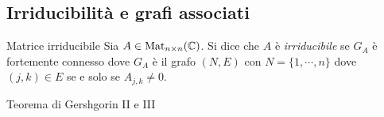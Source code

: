 \documentclass[a4paper]{article}
\begin{document}
\subsection{Irriducibilità e grafi associati}

\begin{snippetdefinition}{Matrice irriducibile}
    Sia \(A \in \operatorname{Mat}_{n \times n}(\mathbb{C})\).
    Si dice che \(A\) è \emph{irriducibile}
    se \(G_A\) è fortemente connesso dove \(G_A\)
    è il grafo \((N, E)\) con \(N = \{1, \cdots, n\}\)
    dove \((j,k) \in E\) se e solo se \(A_{j,k} \neq 0\).
\end{snippetdefinition}

\begin{radioactive}
    \begin{snippetexample}{Teorema di Gershgorin II e III}
        \begin{figure}
            \begin{center}
\end{center}
\end{figure}
\end{snippetexample}
\end{radioactive}
\end{document}
